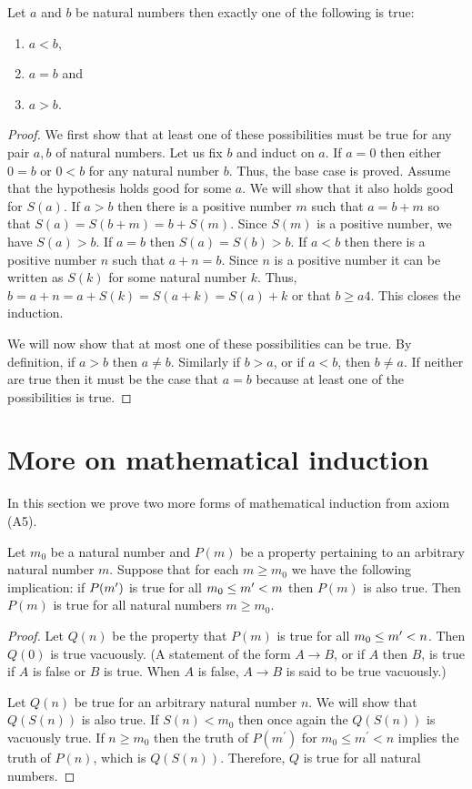 \begin{thm}\label{c1s3t1}
Let $a$ and $b$ be natural numbers then exactly one of the following is 
true:
\begin{enumerate}
\item $a < b$,
\item $a = b$ and
\item $a > b$.
\end{enumerate}
\end{thm}
\begin{proof}
We first show that at least one of these possibilities must be true for 
any pair $a, b$ of natural numbers. Let us fix $b$ and induct on $a$. If
$a = 0$ then either $0 = b$ or $0 < b$ for any natural number $b$. Thus, 
the base case is proved. Assume that the hypothesis holds good for some $a$.
We will show that it also holds good for $S(a)$. If $a > b$ then there is a
positive number $m$ such that $a = b + m$ so that $S(a) = S(b + m) = b +
S(m)$. Since $S(m)$ is a positive number, we have $S(a) > b$. If $a = b$ 
then $S(a) = S(b) > b$. If $a < b$ then there is a positive number $n$
such that $a + n = b$. Since $n$ is a positive number it can be written as
$S(k)$ for some natural number $k$. Thus, $b = a + n = a + S(k) = S(a + k)
= S(a) + k$ or that $b \ge a4$. This closes the induction.

We will now show that at most one of these possibilities can be true. By
definition, if $a > b$ then $a \ne b$. Similarly if $b > a$, or if $a < b$,
then $b \ne a$. If neither are true then it must be the case that $a = b$ 
because at least one of the possibilities is true.
\end{proof}

\section{More on mathematical induction}\label{c1s4}
In this section we prove two more forms of mathematical induction from 
axiom (A5).

\begin{thm}\label{c1s4t1}
Let $m_0$ be a natural number and $P(m)$ be a property pertaining to an
arbitrary natural number $m$. Suppose that for each $m \ge m_0$ we have 
the following implication: if $P(m^\prime)$ is true for all $m_0 \le m^\prime
< m$ then $P(m)$ is also true. Then $P(m)$ is true for all natural numbers
$m \ge m_0$.
\end{thm}
\begin{proof}
Let $Q(n)$ be the property that $P(m)$ is true for all $m_0 \le m^\prime < n$.
Then $Q(0)$ is true vacuously. (A statement of the form $A \rightarrow B$, 
or if $A$ then $B$, is true if $A$ is false or $B$ is true. When $A$ is
false, $A \rightarrow B$ is said to be true vacuously.)

Let $Q(n)$ be true for an arbitrary natural number $n$. We will show that
$Q(S(n))$ is also true. If $S(n) < m_0$ then once again the $Q(S(n))$ is
vacuously true. If $n \ge m_0$ then the truth of $P(m^\prime)$ for $m_0
\le m^\prime < n$ implies the truth of $P(n)$, which is $Q(S(n))$. 
Therefore, $Q$ is true for all natural numbers.
\end{proof}

